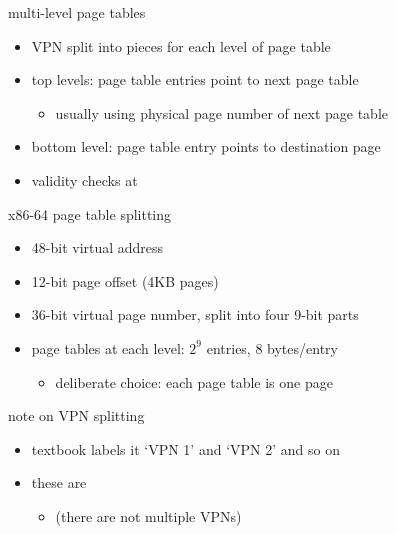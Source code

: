 \begin{frame}{multi-level page tables}
    \begin{itemize}
    \item VPN split into pieces for each level of page table
    \vspace{.5cm}
    \item top levels: page table entries point to next page table
        \begin{itemize}
        \item usually using physical page number of next page table
        \end{itemize}
    \item bottom level: page table entry points to destination page
    \vspace{.5cm}
    \item validity checks at 
    \end{itemize}
\end{frame}

\begin{frame}{x86-64 page table splitting}
    \begin{itemize}
    \item 48-bit virtual address
    \item 12-bit page offset (4KB pages)
    \item 36-bit virtual page number, split into four 9-bit parts
    \item page tables at each level: $2^9$ entries, 8 bytes/entry
        \begin{itemize}
        \item deliberate choice: each page table is one page
        \end{itemize}
    \end{itemize}
\end{frame}

\begin{frame}{note on VPN splitting}
    \begin{itemize}
    \item textbook labels it `VPN 1' and `VPN 2' and so on
    \item these are 
        \begin{itemize}
        \item (there are not multiple VPNs)
        \end{itemize}
    \end{itemize}
\end{frame}
